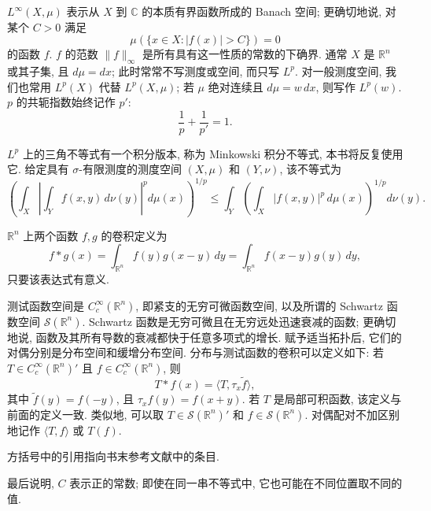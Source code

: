 \clearpage
\hypertarget{frontmatter-page-012}{}

$L^\infty(X,\mu)$ 表示从 $X$ 到 $\mathbb C$ 的本质有界函数所成的 Banach 空间; 更确切地说, 对某个 $C>0$ 满足
\[
\mu(\{x\in X:|f(x)|>C\})=0
\]
的函数 $f$. $f$ 的范数 $\|f\|_\infty$ 是所有具有这一性质的常数的下确界. 通常 $X$ 是 $\mathbb R^n$ 或其子集, 且 $d\mu=dx$; 此时常常不写测度或空间, 而只写 $L^p$. 对一般测度空间, 我们也常用 $L^p(X)$ 代替 $L^p(X,\mu)$; 若 $\mu$ 绝对连续且 $d\mu=w\,dx$, 则写作 $L^p(w)$. $p$ 的共轭指数始终记作 $p'$:
\[
\frac1p+\frac1{p'}=1.
\]

$L^p$ 上的三角不等式有一个积分版本, 称为 Minkowski 积分不等式, 本书将反复使用它. 给定具有 $\sigma$-有限测度的测度空间 $(X,\mu)$ 和 $(Y,\nu)$, 该不等式为
\[
\left(\int_X\left|\int_Y f(x,y)\,d\nu(y)\right|^p d\mu(x)\right)^{1/p}
\leq\int_Y\left(\int_X|f(x,y)|^p\,d\mu(x)\right)^{1/p}d\nu(y).
\]

$\mathbb R^n$ 上两个函数 $f,g$ 的卷积定义为
\[
f*g(x)=\int_{\mathbb R^n}f(y)g(x-y)\,dy
=\int_{\mathbb R^n}f(x-y)g(y)\,dy,
\]
只要该表达式有意义.

测试函数空间是 $C_c^\infty(\mathbb R^n)$, 即紧支的无穷可微函数空间, 以及所谓的 Schwartz 函数空间 $\mathcal S(\mathbb R^n)$. Schwartz 函数是无穷可微且在无穷远处迅速衰减的函数; 更确切地说, 函数及其所有导数的衰减都快于任意多项式的增长. 赋予适当拓扑后, 它们的对偶分别是分布空间和缓增分布空间. 分布与测试函数的卷积可以定义如下: 若 $T\in C_c^\infty(\mathbb R^n)'$ 且 $f\in C_c^\infty(\mathbb R^n)$, 则
\[
T*f(x)=\langle T,\tau_x\widetilde f\rangle,
\]
其中 $\widetilde f(y)=f(-y)$, 且 $\tau_xf(y)=f(x+y)$. 若 $T$ 是局部可积函数, 该定义与前面的定义一致. 类似地, 可以取 $T\in\mathcal S(\mathbb R^n)'$ 和 $f\in\mathcal S(\mathbb R^n)$. 对偶配对不加区别地记作 $\langle T,f\rangle$ 或 $T(f)$.

方括号中的引用指向书末参考文献中的条目.

最后说明, $C$ 表示正的常数; 即使在同一串不等式中, 它也可能在不同位置取不同的值.
